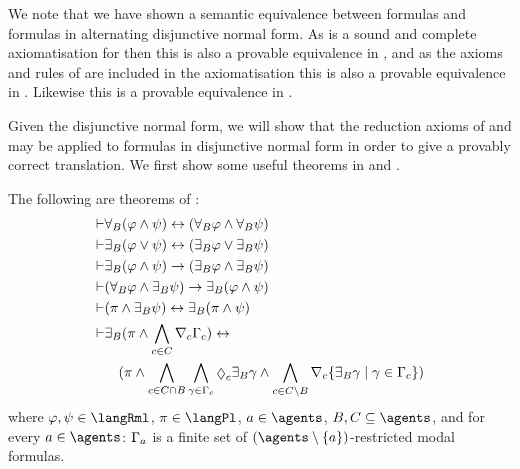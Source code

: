 
We note that we have shown a semantic equivalence between \langMl{} formulas and formulas in alternating disjunctive normal form.
As \axiomKFF{} is a sound and complete axiomatisation for \logicKFF{} then this is also a provable equivalence in \axiomKFF{}, and as the axioms and rules of \axiomKFF{} are included in the axiomatisation \axiomRmlKFF{} this is also a provable equivalence in \axiomRmlKFF{}.
Likewise this is a provable equivalence in \axiomRmlKD{}.

Given the disjunctive normal form, we will show that the reduction axioms of \axiomRmlKFF{} and \axiomRmlKD{} may be applied to formulas in disjunctive normal form in order to give a provably correct translation.
We first show some useful theorems in \axiomRmlKFF{} and \axiomRmlKD{}.

\begin{lemma}\label{rml-k45-theorems}
The following are theorems of \axiomRmlKFF{}:
\begin{align}
    \proves & \allrefsBs (\phi \land \psi) \iff (\allrefsBs \phi \land \allrefsBs \psi) \label{rml-k45-and}\\
    \proves & \somerefsBs (\phi \lor \psi) \iff (\somerefsBs \phi \lor \somerefsBs \psi) \label{rml-k45-or}\\
    \proves & \somerefsBs (\phi \land \psi) \implies (\somerefsBs \phi \land \somerefsBs \psi) \label{rml-k45-d-and}\\
    \proves & (\allrefsBs \phi \land \somerefsBs \psi) \implies \somerefsBs (\phi \land \psi) \label{rml-k45-db-and}\\
    \proves & (\pi \land \somerefsBs \psi) \iff \somerefsBs (\pi \land \psi) \label{rml-k45-pd-and}\\
    \proves & \displaystyle \somerefsBs (\pi \land \bigwedge_{\agentC \in \agentsC} \coverC \Gamma_\agentC) \iff \nonumber\\
            & \displaystyle \quad
            (
            \pi \land
            \bigwedge_{\agentC \in \agentsC \cap \agentsB} \bigwedge_{\gamma \in \Gamma_\agentC} \possibleC \somerefsBs \gamma \land
            \bigwedge_{\agentC \in \agentsC \setminus \agentsB} \coversC \{\somerefsBs \gamma \mid \gamma \in \Gamma_\agentC\} 
            ) \label{rml-k45-cover}
\end{align}
where $\phi, \psi \in \langRml$, $\pi \in \langPl$, $\agentA \in \agents$, $\agentsB, \agentsC \subseteq \agents$, and for every $\agentA \in \agents$: $\Gamma_a$ is a finite set of $(\agents \setminus \{\agentA\})$-restricted modal formulas.
\end{lemma}

